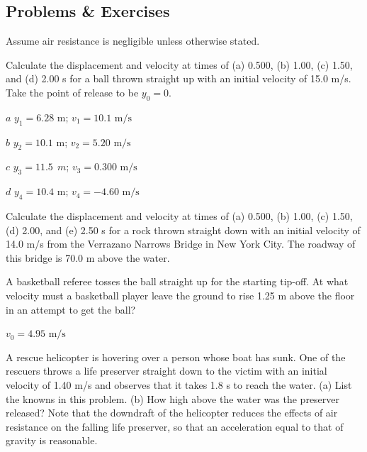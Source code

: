 \documentclass[
]{book}
\newenvironment{problems-exercises}{}{}
\begin{document}
\hypertarget{fs-id3514521}{}
\begin{problems-exercises}

\hypertarget{problems-exercises-4}{%
\subsection{Problems \& Exercises}\label{problems-exercises-4}}

Assume air resistance is negligible unless otherwise stated.

\hypertarget{fs-id1516821}{}
\leavevmode\hypertarget{fs-id2558696}{}%
Calculate the displacement and velocity at times of (a) 0.500, (b) 1.00,
(c) 1.50, and (d) 2.00 s for a ball thrown straight up with an initial
velocity of 15.0 m/s. Take the point of release to be \({y_{0} = 0}{}\).

\leavevmode\hypertarget{fs-id1722520}{}%
\(a\) \({{y_{1} = 6}\text{.}\text{28\ m}}{}\);
\({{v_{1} = \text{10}}\text{.}\text{1\ m/s}}{}\)

\(b\) \({{y_{2} = \text{10}}\text{.}\text{1\ m}}{}\);
\({{v_{2} = 5}\text{.}\text{20\ m/s}}{}\)

\(c\) \({{y_{3} = 11}\text{.}5\ \ m}{}\);
\({{v_{3} = 0}\text{.300\ m/s}}{}\)

\(d\) \({y_{4} = 10}\text{.4\ m}\); \({{v_{4} = {- 4}}\text{.60\ m/s}}{}\)

\hypertarget{fs-id1746555}{}
\leavevmode\hypertarget{fs-id4057791}{}%
Calculate the displacement and velocity at times of (a) 0.500, (b) 1.00,
(c) 1.50, (d) 2.00, and (e) 2.50 s for a rock thrown straight down with
an initial velocity of 14.0 m/s from the Verrazano Narrows Bridge in New
York City. The roadway of this bridge is 70.0 m above the water.

\hypertarget{fs-id1781525}{}
\leavevmode\hypertarget{fs-id1781526}{}%
A basketball referee tosses the ball straight up for the starting
tip-off. At what velocity must a basketball player leave the ground to
rise 1.25 m above the floor in an attempt to get the ball?

\leavevmode\hypertarget{fs-id2300377}{}%
\({{v_{0} = 4}\text{.}\text{95\ m/s}}{}\)

\hypertarget{fs-id1582773}{}
\leavevmode\hypertarget{fs-id2593341}{}%
A rescue helicopter is hovering over a person whose boat has sunk. One
of the rescuers throws a life preserver straight down to the victim with
an initial velocity of 1.40 m/s and observes that it takes 1.8 s to
reach the water. (a) List the knowns in this problem. (b) How high above
the water was the preserver released? Note that the downdraft of the
helicopter reduces the effects of air resistance on the falling life
preserver, so that an acceleration equal to that of gravity is
reasonable.


\end{problems-exercises}
\end{document}
